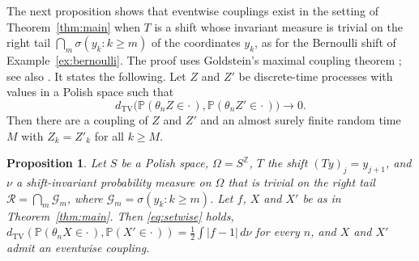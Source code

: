 \documentclass[11pt]{amsart}
\newtheorem{proposition}[theorem]{Proposition}
\theoremstyle{definition}
\theoremstyle{remark}
\newcommand{\Z}{\mathbb Z}
\newcommand{\Prob}{\mathbb P}
\newcommand{\dtv}{d_{\mathrm{TV}}}
\begin{document}
The next proposition shows that eventwise couplings exist in the setting of Theorem~\ref{thm:main} when $T$ is a shift
whose invariant measure is trivial on the right tail $\bigcap_m\sigma(y_k:k\ge m)$ of the coordinates $y_k$, as for the Bernoulli shift of Example~\ref{ex:bernoulli}. The proof uses
Goldstein's maximal coupling theorem \cite{Gol79}; see also \cite[Chapter~4]{Tho00}. It states the following. Let $Z$
and $Z'$ be discrete-time processes with values in a Polish space such that
\[
\dtv\bigl(\Prob(\theta_nZ\in\cdot\,),\Prob(\theta_nZ'\in\cdot\,)\bigr)\to0 .
\]
Then there are a coupling of $Z$ and $Z'$ and an almost surely finite random time $M$ with $Z_k=Z'_k$ for all $k\ge M$.

\begin{proposition}\label{prop:Ktail}
Let $S$ be a Polish space, $\Omega=S^\Z$, $T$ the shift $(Ty)_j=y_{j+1}$, and $\nu$ a shift-invariant probability
measure on $\Omega$ that is trivial on the right tail $\mathcal R=\bigcap_m\mathcal G_m$, where
$\mathcal G_m=\sigma(y_k:k\ge m)$. Let $f$, $X$ and $X'$ be as in Theorem~\ref{thm:main}. Then \eqref{eq:setwise} holds,
$\dtv(\Prob(\theta_nX\in\cdot\,),\Prob(X'\in\cdot\,))=\frac12\int|f-1|\,d\nu$ for every $n$, and $X$ and $X'$ admit an
eventwise coupling.
\end{proposition}
\end{document}
